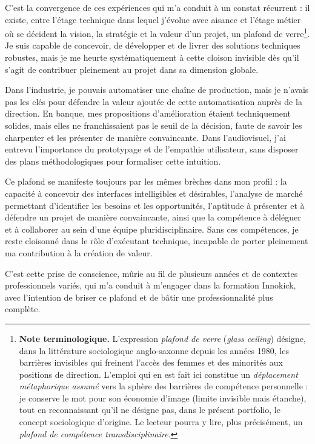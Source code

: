 C'est la convergence de ces expériences qui m'a conduit à un constat récurrent : il existe, entre l'étage technique dans lequel j'évolue avec aisance et l'étage métier où se décident la vision, la stratégie et la valeur d'un projet, un plafond de verre\footnote{\textbf{Note terminologique.} L'expression \emph{plafond de verre} (\textit{glass ceiling}) désigne, dans la littérature sociologique anglo-saxonne depuis les années 1980, les barrières invisibles qui freinent l'accès des femmes et des minorités aux positions de direction. L'emploi qui en est fait ici constitue un \emph{déplacement métaphorique assumé} vers la sphère des barrières de compétence personnelle : je conserve le mot pour son économie d'image (limite invisible mais étanche), tout en reconnaissant qu'il ne désigne pas, dans le présent portfolio, le concept sociologique d'origine. Le lecteur pourra y lire, plus précisément, un \emph{plafond de compétence transdisciplinaire}.\label{fn:plafond-verre}}. Je suis capable de concevoir, de développer et de livrer des solutions techniques robustes, mais je me heurte systématiquement à cette cloison invisible dès qu'il s'agit de contribuer pleinement au projet dans sa dimension globale.

Dans l'industrie, je pouvais automatiser une chaîne de production, mais je n'avais pas les clés pour défendre la valeur ajoutée de cette automatisation auprès de la direction. En banque, mes propositions d'amélioration étaient techniquement solides, mais elles ne franchissaient pas le seuil de la décision, faute de savoir les charpenter et les présenter de manière convaincante. Dans l'audiovisuel, j'ai entrevu l'importance du prototypage et de l'empathie utilisateur, sans disposer des plans méthodologiques pour formaliser cette intuition.

Ce plafond se manifeste toujours par les mêmes brèches dans mon profil : la capacité à concevoir des interfaces intelligibles et désirables, l'analyse de marché permettant d'identifier les besoins et les opportunités, l'aptitude à présenter et à défendre un projet de manière convaincante, ainsi que la compétence à déléguer et à collaborer au sein d'une équipe pluridisciplinaire. Sans ces compétences, je reste cloisonné dans le rôle d'exécutant technique, incapable de porter pleinement ma contribution à la création de valeur.

C'est cette prise de conscience, mûrie au fil de plusieurs années et de contextes professionnels variés, qui m'a conduit à m'engager dans la formation Innokick, avec l'intention de briser ce plafond et de bâtir une professionnalité plus complète.

